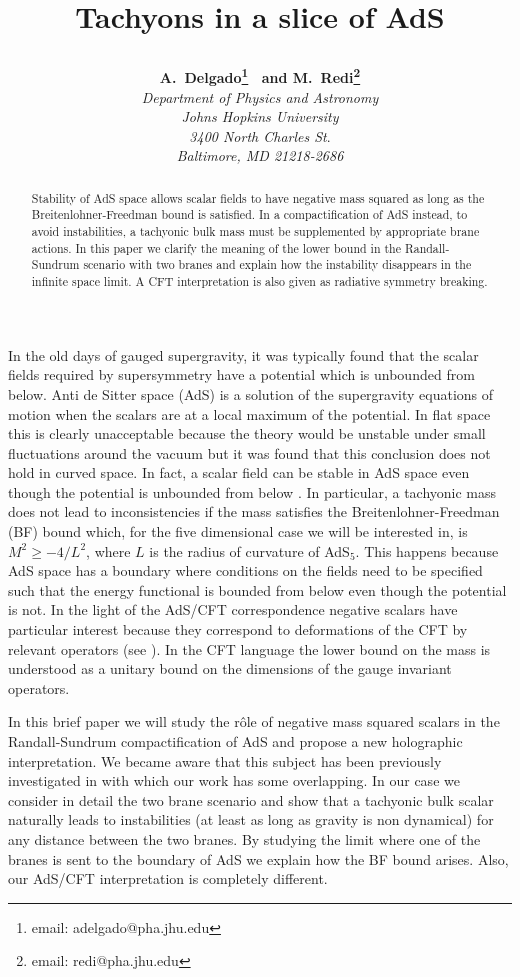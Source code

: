 \documentclass[a4paper,12pt,dvips]{article}
\title{
\vspace{1cm}
%
\Large\textbf{Tachyons in a slice of AdS}
%
\vspace*{.5cm}
\author{\large \textbf{
A.~Delgado\footnote{email: adelgado@pha.jhu.edu}
\mbox{  }and M.~Redi\footnote{email: redi@pha.jhu.edu}}\\
\emph{
Department of Physics and Astronomy} \\
\emph{Johns Hopkins University} \\
\emph{3400 North Charles St}. \\
\emph{Baltimore, MD 21218-2686}}}
\date{}
\begin{document}
\maketitle
\thispagestyle{empty}
\vspace*{.5cm}

\begin{abstract}

 Stability of AdS space allows scalar fields to have negative
 mass squared as long as the Breitenlohner-Freedman bound is
 satisfied. In a compactification
 of AdS instead, to avoid instabilities, a tachyonic bulk mass
 must be supplemented by appropriate brane actions.
 In this paper we clarify the meaning of the lower bound in the
 Randall-Sundrum scenario with two branes
 and explain how the instability disappears in the
 infinite space limit. A CFT
 interpretation is also given as radiative symmetry breaking.
\end{abstract}

\newpage
\renewcommand{\thepage}{\arabic{page}}
\setcounter{page}{1}

In the old days of gauged supergravity, it was typically found
that the scalar fields required by supersymmetry have a potential
which is unbounded from below. Anti de Sitter space (AdS) is a
solution of the supergravity equations of motion when the scalars
are at a local maximum of the potential. In flat space this is
clearly unacceptable because the theory would be unstable under
small fluctuations around the vacuum but it was found that this
conclusion does not hold in curved space. In fact, a scalar field
can be stable in AdS space even though the potential is unbounded
from below \cite{freedman}. In particular, a tachyonic mass does
not lead to inconsistencies if the mass satisfies the
Breitenlohner-Freedman (BF) bound which, for the five dimensional
case we will be interested in, is $M^2 \ge -4/L^2$, where $L$ is
the radius of curvature of AdS$_5$. This happens because AdS space
has a boundary where conditions on the fields need to be specified
such that the energy functional is bounded from below even though
the potential is not. In the light of the AdS/CFT correspondence
negative scalars have particular interest because they correspond
to deformations of the CFT by relevant operators (see
\cite{maldacena}). In the CFT language the lower bound on the mass
is understood as a unitary bound on the dimensions of the gauge
invariant operators.

In this brief paper we will study the r\^ole of negative mass
squared scalars in the Randall-Sundrum compactification of AdS and
propose a new holographic interpretation. We became aware that
this subject has been previously investigated in \cite{japanese}
with which our work has some overlapping. In our case we consider
in detail the two brane scenario and show that a tachyonic bulk
scalar naturally leads to instabilities (at least as long as
gravity is non dynamical) for any distance between the two branes.
By studying the limit where one of the branes is sent to the
boundary of AdS we explain how the BF bound arises. Also, our
AdS/CFT interpretation is completely different.
\end{document}
